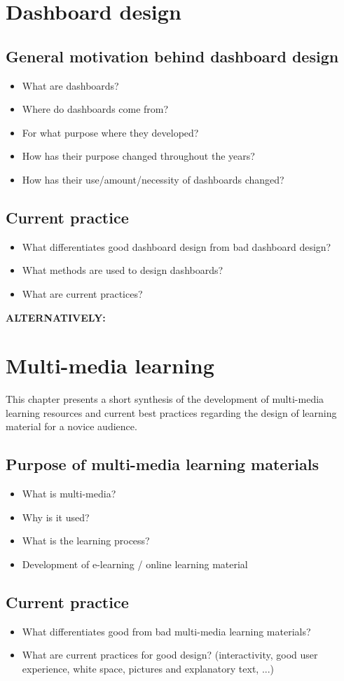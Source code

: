 \chapter{Dashboard design}

\section{General motivation behind dashboard design} \label{sec:DashboardGeneral}
\begin{itemize}
    \item What are dashboards?
    \item Where do dashboards come from?
    \item For what purpose where they developed?
    \item How has their purpose changed throughout the years?
    \item How has their use/amount/necessity of dashboards changed?
\end{itemize}
\section{Current practice} \label{sec:Dashboard_CurrentPractice}
\begin{itemize}
    \item What differentiates good dashboard design from bad dashboard design?
    \item What methods are used to design dashboards?
    \item What are current practices?
\end{itemize}




\textbf{ALTERNATIVELY: }

\chapter{Multi-media learning}

This chapter presents a short synthesis of the development of multi-media learning resources and current best practices regarding the design of learning material for a novice audience. 

\section{Purpose of multi-media learning materials}
\begin{itemize}
    \item What is multi-media?
    \item Why is it used?
    \item What is the learning process?
    \item Development of e-learning / online learning material
\end{itemize}

\section{Current practice}
\begin{itemize}
    \item What differentiates good from bad multi-media learning materials?
    \item What are current practices for good design? (interactivity, good user experience, white space, pictures and explanatory text, ...)
\end{itemize}
